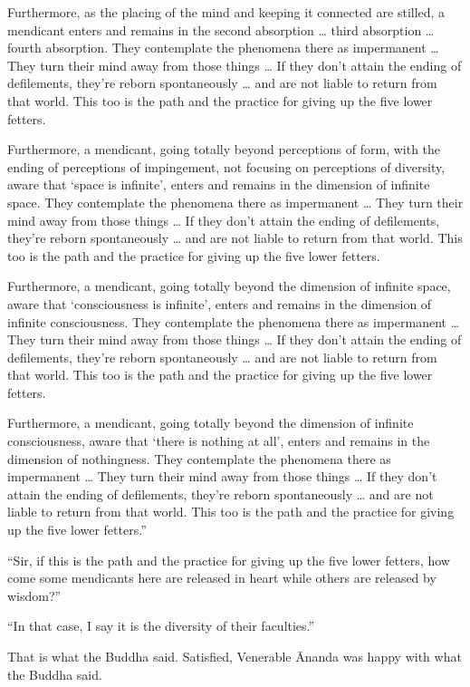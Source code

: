 \documentclass[12pt,openany]{book}%
\begin{document}
Furthermore, as the placing of the mind and keeping it connected are stilled, a mendicant enters and remains in the second absorption … third absorption … fourth absorption. They contemplate the phenomena there as impermanent … They turn their mind away from those things … If they don’t attain the ending of defilements, they’re reborn spontaneously … and are not liable to return from that world. This too is the path and the practice for giving up the five lower fetters. 

Furthermore, a mendicant, going totally beyond perceptions of form, with the ending of perceptions of impingement, not focusing on perceptions of diversity, aware that ‘space is infinite’, enters and remains in the dimension of infinite space. They contemplate the phenomena there as impermanent … They turn their mind away from those things … If they don’t attain the ending of defilements, they’re reborn spontaneously … and are not liable to return from that world. This too is the path and the practice for giving up the five lower fetters. 

Furthermore, a mendicant, going totally beyond the dimension of infinite space, aware that ‘consciousness is infinite’, enters and remains in the dimension of infinite consciousness. They contemplate the phenomena there as impermanent … They turn their mind away from those things … If they don’t attain the ending of defilements, they’re reborn spontaneously … and are not liable to return from that world. This too is the path and the practice for giving up the five lower fetters. 

Furthermore, a mendicant, going totally beyond the dimension of infinite consciousness, aware that ‘there is nothing at all’, enters and remains in the dimension of nothingness. They contemplate the phenomena there as impermanent … They turn their mind away from those things … If they don’t attain the ending of defilements, they’re reborn spontaneously … and are not liable to return from that world. This too is the path and the practice for giving up the five lower fetters.” 

“Sir, if this is the path and the practice for giving up the five lower fetters, how come some mendicants here are released in heart while others are released by wisdom?” 

“In that case, I say it is the diversity of their faculties.” 

That is what the Buddha said. Satisfied, Venerable Ānanda was happy with what the Buddha said. 
\end{document}
